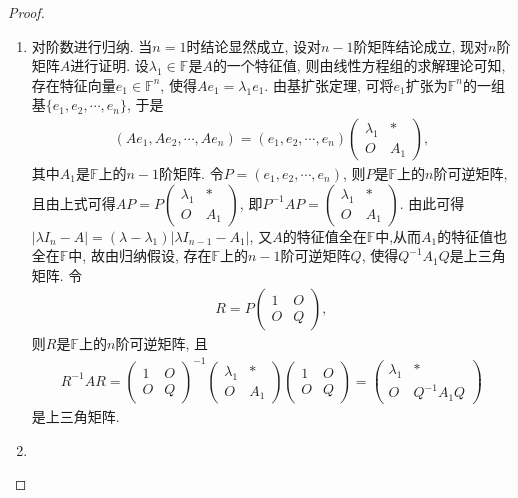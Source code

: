 \documentclass[../../main.tex]{subfiles}%
\begin{document}
\begin{proof}
\begin{enumerate}
\item 对阶数进行归纳. 当\(n = 1\)时结论显然成立, 设对\(n - 1\)阶矩阵结论成立, 现对\(n\)阶矩阵\(A\)进行证明. 设\(\lambda_{1} \in \mathbb{F}\)是\(A\)的一个特征值, 则由线性方程组的求解理论可知, 存在特征向量\(e_{1} \in \mathbb{F}^n\), 使得\(Ae_{1}=\lambda_{1}e_{1}\). 由基扩张定理, 可将\(e_{1}\)扩张为\(\mathbb{F}^n\)的一组基\(\{e_{1},e_{2},\cdots ,e_{n}\}\), 于是
\begin{align*}
(Ae_{1},Ae_{2},\cdots ,Ae_{n})=(e_{1},e_{2},\cdots ,e_{n})\begin{pmatrix}
\lambda_{1}& *\\
O&A_{1}
\end{pmatrix},
\end{align*}
其中\(A_{1}\)是\(\mathbb{F}\)上的\(n - 1\)阶矩阵. 令\(P=(e_{1},e_{2},\cdots ,e_{n})\), 则\(P\)是\(\mathbb{F}\)上的\(n\)阶可逆矩阵, 且由上式可得\(AP = P\begin{pmatrix}
\lambda_{1}& *\\
O&A_{1}
\end{pmatrix}\), 即\(P^{-1}AP=\begin{pmatrix}
\lambda_{1}& *\\
O&A_{1}
\end{pmatrix}\). 由此可得\(|\lambda I_{n}-A| = (\lambda - \lambda_{1})|\lambda I_{n - 1}-A_{1}|\), 又$A$的特征值全在$\mathbb{F}$中,从而\(A_{1}\)的特征值也全在\(\mathbb{F}\)中, 故由归纳假设, 存在\(\mathbb{F}\)上的\(n - 1\)阶可逆矩阵\(Q\), 使得\(Q^{-1}A_{1}Q\)是上三角矩阵. 令
\begin{align*}
R = P\begin{pmatrix}
1& O\\
O& Q
\end{pmatrix},
\end{align*}
则\(R\)是\(\mathbb{F}\)上的\(n\)阶可逆矩阵, 且
\begin{align*}
R^{-1}AR=\begin{pmatrix}
1& O\\
O& Q
\end{pmatrix}^{-1}\begin{pmatrix}
\lambda_{1}& *\\
O&A_{1}
\end{pmatrix}\begin{pmatrix}
1& O\\
O& Q
\end{pmatrix}=\begin{pmatrix}
\lambda_{1}& *\\
O&Q^{-1}A_{1}Q
\end{pmatrix}
\end{align*}
是上三角矩阵. 

\item 
\end{enumerate}
\end{proof}
\end{document}
